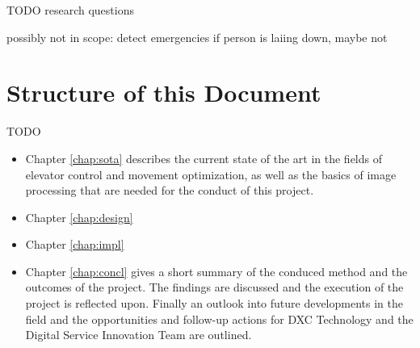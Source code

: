 TODO research questions

possibly not in scope: detect emergencies if person is laiing down, maybe not


\section{Structure of this Document}

TODO

\begin{itemize}
    \item Chapter \ref{chap:sota} describes the current state of the art in the fields of elevator control and movement optimization, as well as the basics of image processing that are needed for the conduct of this project.
    \item Chapter \ref{chap:design} 
    \item Chapter \ref{chap:impl}
    \item Chapter \ref{chap:concl} gives a short summary of the conduced method and the outcomes of the project. The findings are discussed and the execution of the project is reflected upon. Finally an outlook into future developments in the field and the opportunities and follow-up actions for DXC Technology and the Digital Service Innovation Team are outlined.
\end{itemize}